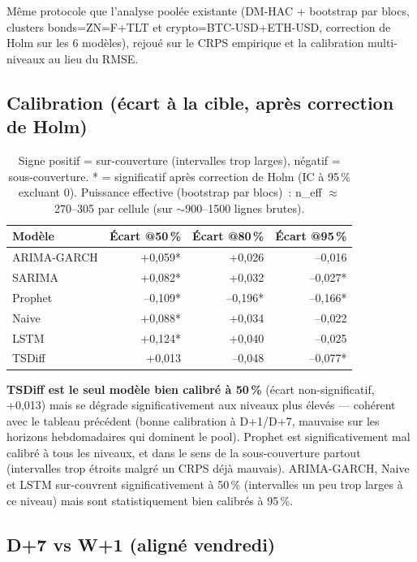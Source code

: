 \documentclass[11pt]{article}
\begin{document}
M\^eme protocole que l'analyse pool\'ee existante (DM-HAC + bootstrap par
blocs, clusters bonds=ZN=F+TLT et crypto=BTC-USD+ETH-USD, correction de Holm
sur les 6 mod\`eles), rejou\'e sur le CRPS empirique et la calibration
multi-niveaux au lieu du RMSE.

\subsection{Calibration (\'ecart \`a la cible, apr\`es correction de Holm)}

\begin{table}[h]
\centering
\begin{tabular}{lrrr}
\toprule
Mod\`ele & \'Ecart @50\,\% & \'Ecart @80\,\% & \'Ecart @95\,\% \\
\midrule
ARIMA-GARCH & +0,059* & +0,026 & --0,016 \\
SARIMA      & +0,082* & +0,032 & --0,027* \\
Prophet     & --0,109* & --0,196* & --0,166* \\
Naive       & +0,088* & +0,034 & --0,022 \\
LSTM        & +0,124* & +0,040 & --0,025 \\
TSDiff      & +0,013 & --0,048 & --0,077* \\
\bottomrule
\end{tabular}
\caption{Signe positif = sur-couverture (intervalles trop larges), n\'egatif
= sous-couverture. * = significatif apr\`es correction de Holm (IC \`a 95\,\%
excluant 0). Puissance effective (bootstrap par blocs)~: n\_eff $\approx$
270--305 par cellule (sur $\sim$900--1500 lignes brutes).}
\end{table}

\textbf{TSDiff est le seul mod\`ele bien calibr\'e \`a 50\,\%} (\'ecart
non-significatif, +0,013) mais se d\'egrade significativement aux niveaux
plus \'elev\'es --- coh\'erent avec le tableau pr\'ec\'edent (bonne
calibration \`a D+1/D+7, mauvaise sur les horizons hebdomadaires qui dominent
le pool). Prophet est significativement mal calibr\'e \`a tous les niveaux,
et dans le sens de la sous-couverture partout (intervalles trop \'etroits
malgr\'e un CRPS d\'ej\`a mauvais). ARIMA-GARCH, Naive et LSTM sur-couvrent
significativement \`a 50\,\% (intervalles un peu trop larges \`a ce niveau)
mais sont statistiquement bien calibr\'es \`a 95\,\%.

\subsection{D+7 vs W+1 (align\'e vendredi)}
\end{document}
